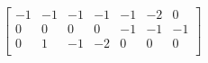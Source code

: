 \documentclass{article}
\begin{document}
 $
\left[
\begin{array}{c|c|c|c|c|c|c}
-1 & -1 & -1 & -1 & -1 & -2 & 0 \\
0 & 0 & 0 & 0 & -1 & -1 & -1 \\
0 & 1 & -1 & -2 & 0 & 0 & 0 \\
\end{array}
\right] $
\end{document}

